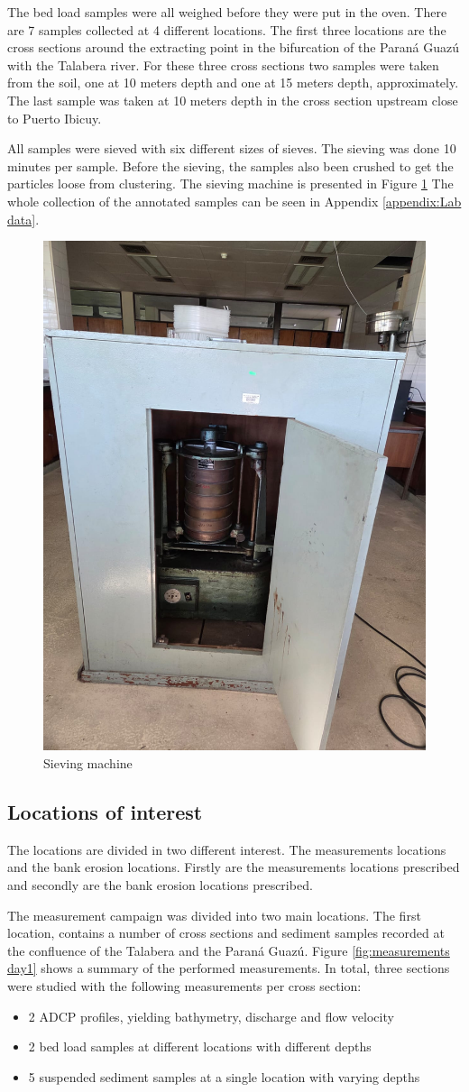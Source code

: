 The bed load samples were all weighed before they were put in the oven. There are 7 samples collected at 4 different locations. The first three locations are the cross sections around the extracting point in the bifurcation of the Paraná Guazú with the Talabera river. For these three cross sections two samples were taken from the soil, one at 10 meters depth and one at 15 meters depth, approximately. 
The last sample was taken at 10 meters depth in the cross section upstream close to Puerto Ibicuy. 

All samples were sieved with six different sizes of sieves. The sieving was done 10 minutes per sample. Before the sieving, the samples also been crushed to get the particles loose from clustering. The sieving machine is presented in Figure \ref{fig:siev} The whole collection of the annotated samples can be seen in Appendix \ref{appendix:Lab data}.

\begin{figure}[H]
    \centering
    \includegraphics[width=0.5\linewidth]{figures//ch3/siev.png}
    \caption{Sieving machine}
    \label{fig:siev}
\end{figure}


\subsection{Locations of interest}
The locations are divided in two different interest. The measurements locations and the bank erosion locations. Firstly are the measurements locations prescribed and secondly are the bank erosion locations prescribed. 

The measurement campaign was divided into two main locations. The first location, contains a number of cross sections and sediment samples recorded at the confluence of the Talabera and the Paraná Guazú. Figure \ref{fig:measurements day1} shows a summary of the performed measurements. In total, three sections were studied with the following measurements per cross section:
\begin{itemize}
    \item 2 ADCP profiles, yielding bathymetry, discharge and flow velocity
    \item 2 bed load samples at different locations with different depths
    \item 5 suspended sediment samples at a single location with varying depths
\end{itemize}

